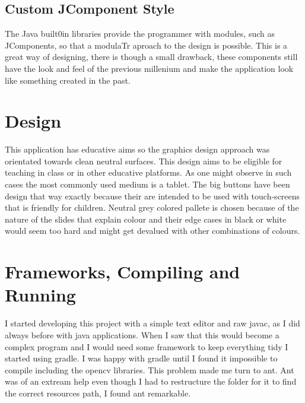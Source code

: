 \documentclass[a4paper, 11pt]{paper}
\begin{document}
\subsection{Custom JComponent Style}
\indent\par
The Java built0in libraries provide the programmer with modules, such as JComponents,
so that a modulaTr aproach to the design is possible. This is a great way of designing, there is though a small drawback,
these components still have the look and feel of the previous millenium and make the application look like something created in the past.

\section{Design}
This application has educative aims so the graphics design approach was orientated towards clean neutral surfaces.
This design aims to be eligible for teaching in class or in other educative platforms. As one might observe in
such cases the most commonly used medium is a tablet. The big buttons have been design that way exactly because their are
intended to be used with touch-screens that is friendly for children.
Neutral grey colored pallete is chosen because of the nature of the slides that explain colour and their edge cases in black or
white would seem too hard and might get devalued with other combinations of colours.

\section{Frameworks, Compiling and Running}
I started developing this project with a simple text editor and raw javac, as I did always before with java applications.
When I saw that this would become a complex program and I would need some framework to keep everything tidy I started using gradle.
I was happy with gradle until I found it impossible to compile including the opencv libraries. This problem made me turn to ant.
Ant was of an extream help even though I had to restructure the folder for it to find the correct resources path, I found ant remarkable.\\
\end{document}
